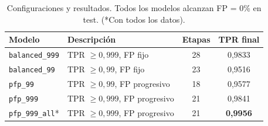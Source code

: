 \documentclass[11pt,spanish,listoffigures,listoftables]{tfgetsinf}
\begin{document}
\begin{table}[H]
    \centering
    \small %
    \begin{tabular}{llcc}
        \toprule
        \textbf{Modelo} & \textbf{Descripción} & \textbf{Etapas} & \textbf{TPR final} \\
        \midrule
        \texttt{balanced\_999} & TPR $\geq 0{,}999$, FP fijo & 28 & 0,9833 \\
        \texttt{balanced\_99}  & TPR $\geq 0{,}99$, FP fijo  & 23 & 0,9516 \\
        \texttt{pfp\_99}       & TPR $\geq 0{,}99$, FP progresivo  & 18 & 0,9577 \\
        \texttt{pfp\_999}      & TPR $\geq 0{,}999$, FP progresivo & 21 & 0,9841 \\
        \texttt{pfp\_999\_all}* & TPR $\geq 0{,}999$, FP progresivo & 21 & \textbf{0,9956} \\
        \bottomrule
    \end{tabular}
    \caption{Configuraciones y resultados. Todos los modelos alcanzan FP = 0\% en test. (*Con todos los datos).}
    \label{tab:model_configs}
\end{table}
\end{document}
